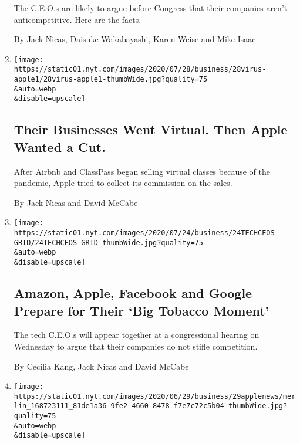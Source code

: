 \begin{enumerate}
  The C.E.O.s are likely to argue before Congress that their companies
  aren't anticompetitive. Here are the facts.

  By Jack Nicas, Daisuke Wakabayashi, Karen Weise and Mike Isaac
\item
  \href{/2020/07/28/technology/apple-app-store-airbnb-classpass.html}{}

  \texttt{[image: https://static01.nyt.com/images/2020/07/28/business/28virus-apple1/28virus-apple1-thumbWide.jpg?quality=75\\\&auto=webp\\\&disable=upscale]}

  \hypertarget{their-businesses-went-virtual-then-apple-wanted-a-cut}{%
  \subsection{Their Businesses Went Virtual. Then Apple Wanted a
  Cut.}\label{their-businesses-went-virtual-then-apple-wanted-a-cut}}

  After Airbnb and ClassPass began selling virtual classes because of
  the pandemic, Apple tried to collect its commission on the sales.

  By Jack Nicas and David McCabe
\item
  \href{/2020/07/28/technology/amazon-apple-facebook-google-antitrust-hearing.html}{}

  \texttt{[image: https://static01.nyt.com/images/2020/07/24/business/24TECHCEOS-GRID/24TECHCEOS-GRID-thumbWide.jpg?quality=75\\\&auto=webp\\\&disable=upscale]}

  \hypertarget{amazon-apple-facebook-and-google-prepare-for-their-big-tobacco-moment}{%
  \subsection{Amazon, Apple, Facebook and Google Prepare for Their `Big
  Tobacco
  Moment'}\label{amazon-apple-facebook-and-google-prepare-for-their-big-tobacco-moment}}

  The tech C.E.O.s will appear together at a congressional hearing on
  Wednesday to argue that their companies do not stifle competition.

  By Cecilia Kang, Jack Nicas and David McCabe
\item
  \href{/2020/06/29/technology/new-york-times-apple-news-app.html}{}

  \texttt{[image: https://static01.nyt.com/images/2020/06/29/business/29applenews/merlin\_168723111\_81de1a36-9fe2-4660-8478-f7e7c72c5b04-thumbWide.jpg?quality=75\\\&auto=webp\\\&disable=upscale]}


\end{enumerate}
